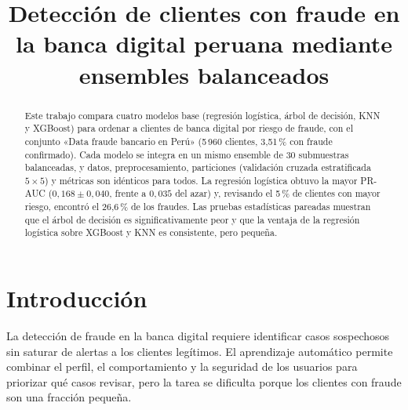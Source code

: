 \documentclass[conference,a4paper]{IEEEtran}
\begin{document}
\title{Detección de clientes con fraude en la banca digital peruana mediante ensembles balanceados}

\author{
}

\maketitle

\begin{abstract}
Este trabajo compara cuatro modelos base (regresión logística, árbol de decisión, KNN y
XGBoost) para ordenar a clientes de banca digital por riesgo de fraude, con el conjunto «Data
fraude bancario en Perú» (5\,960 clientes, 3,51\,\% con fraude confirmado). Cada modelo se
integra en un mismo ensemble de 30 submuestras balanceadas, y datos, preprocesamiento,
particiones (validación cruzada estratificada $5\times5$) y métricas son idénticos para todos. La regresión logística obtuvo la mayor PR-AUC ($0{,}168 \pm 0{,}040$, frente a
$0{,}035$ del azar) y, revisando el 5\,\% de clientes con mayor riesgo, encontró el 26,6\,\%
de los fraudes. Las pruebas estadísticas pareadas muestran que el árbol de decisión es
significativamente peor y que la ventaja de la regresión logística sobre XGBoost y KNN es
consistente, pero pequeña.
\end{abstract}

\section{Introducción}

La detección de fraude en la banca digital requiere identificar casos sospechosos sin
saturar de alertas a los clientes legítimos. El aprendizaje automático permite combinar el
perfil, el comportamiento y la seguridad de los usuarios para priorizar qué casos revisar, pero
la tarea se dificulta porque los clientes con fraude son una fracción pequeña.
\end{document}
